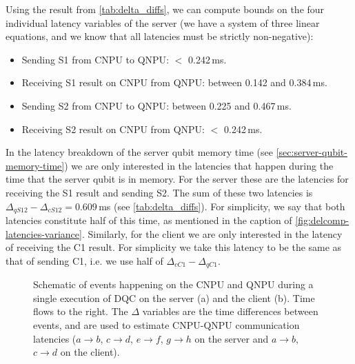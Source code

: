 Using the result from \cref{tab:delta_diffs}, we can compute bounds on the four individual latency variables of the server (we have a system of three linear equations, and we know that all latencies must be strictly non-negative):
%
\begin{itemize}
    \item Sending S1 from \ac{CNPU} to \ac{QNPU}: $<$ 0.242\,ms.
    \item Receiving S1 result on \ac{CNPU} from \ac{QNPU}: between 0.142 and 0.384\,ms.
    \item Sending S2 from \ac{CNPU} to \ac{QNPU}: between 0.225 and 0.467\,ms.
    \item Receiving S2 result on \ac{CNPU} from QNPU: $<$ 0.242\,ms.
\end{itemize}

In the latency breakdown of the server qubit memory time (see \cref{sec:server-qubit-memory-time}) we are only interested in the latencies that happen during the time that the server qubit is in memory. For the server these are the latencies for receiving the S1 result and sending S2. The sum of these two latencies is $\Delta_{qS12} - \Delta_{cS12} = 0.609$\,ms (see \cref{tab:delta_diffs}). For simplicity, we say that both latencies constitute half of this time, as mentioned in the caption of \cref{fig:delcomp-latencies-variance}. Similarly, for the client we are only interested in the latency of receiving the C1 result. For simplicity we take this latency to be the same as that of sending C1, i.e. we use half of $\Delta_{cC1} - \Delta_{qC1}$.

\begin{figure}[htbp]
    \centering
    \hfill
    \caption{Schematic of events happening on the \ac{CNPU} and \ac{QNPU} during a single execution of \ac{DQC} on the server (a) and the client (b). Time flows to the right. The $\Delta$ variables are the time differences between events, and are used to estimate \ac{CNPU}-\ac{QNPU} communication latencies ($a\rightarrow b$, $c\rightarrow d$, $e\rightarrow f$, $g\rightarrow h$ on the server and $a\rightarrow b$, $c\rightarrow d$ on the client).}
    \label{fig:cnpu_qnpu_latencies}%
\end{figure}


